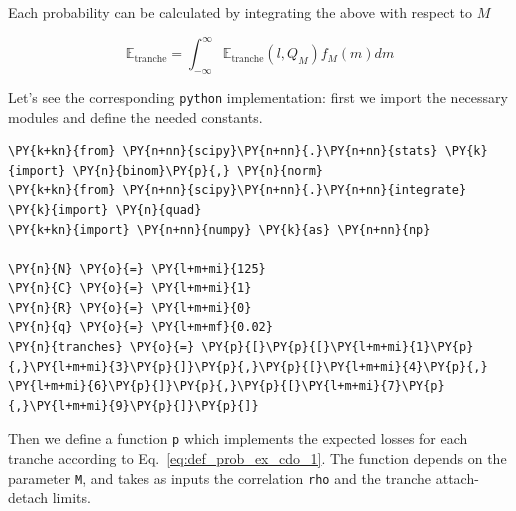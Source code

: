 Each probability can be calculated by integrating the above with respect to $M$
	
\begin{equation} 
\mathbb{E}_{\mathrm{tranche}} = \int_{-\infty}^{\infty}{\mathbb{E}_{\mathrm{tranche}}(l, Q_M) f_M(m)dm}
\end{equation}

Let's see the corresponding \texttt{python} implementation:
first we import the necessary modules and define the needed constants.

\begin{codebox}
\begin{Verbatim}[commandchars=\\\{\}]
\PY{k+kn}{from} \PY{n+nn}{scipy}\PY{n+nn}{.}\PY{n+nn}{stats} \PY{k}{import} \PY{n}{binom}\PY{p}{,} \PY{n}{norm}
\PY{k+kn}{from} \PY{n+nn}{scipy}\PY{n+nn}{.}\PY{n+nn}{integrate} \PY{k}{import} \PY{n}{quad}
\PY{k+kn}{import} \PY{n+nn}{numpy} \PY{k}{as} \PY{n+nn}{np}
	
\PY{n}{N} \PY{o}{=} \PY{l+m+mi}{125}
\PY{n}{C} \PY{o}{=} \PY{l+m+mi}{1}
\PY{n}{R} \PY{o}{=} \PY{l+m+mi}{0}
\PY{n}{q} \PY{o}{=} \PY{l+m+mf}{0.02}
\PY{n}{tranches} \PY{o}{=} \PY{p}{[}\PY{p}{[}\PY{l+m+mi}{1}\PY{p}{,}\PY{l+m+mi}{3}\PY{p}{]}\PY{p}{,}\PY{p}{[}\PY{l+m+mi}{4}\PY{p}{,} \PY{l+m+mi}{6}\PY{p}{]}\PY{p}{,}\PY{p}{[}\PY{l+m+mi}{7}\PY{p}{,}\PY{l+m+mi}{9}\PY{p}{]}\PY{p}{]}
\end{Verbatim}
\end{codebox}

Then we define a function \texttt{p} which implements the expected losses for each tranche according to Eq.~\ref{eq:def_prob_ex_cdo_1}.
The function depends on the parameter \texttt{M}, and takes as inputs the correlation \texttt{rho} and the tranche attach-detach limits.
	
